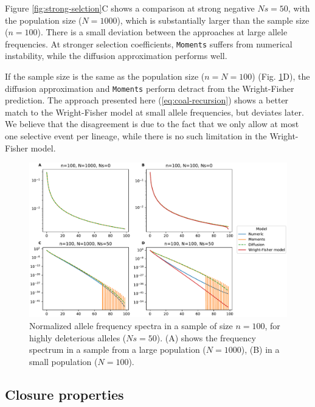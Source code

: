 \documentclass[review]{elsarticle}
\begin{document}
Figure \ref{fig:strong-selction}C shows a comparison at strong negative $Ns=50$, with the population
size ($N=1000$), which is substantially larger than the sample size ($n=100$). There is a small
deviation between the approaches at large allele frequencies. At stronger selection coefficients,
\texttt{Moments} suffers from numerical instability, while the diffusion approximation performs
well.

If the sample size is the same as the population size ($n=N=100$) (Fig.
\ref{fig:strong-selection}D), the diffusion approximation and \texttt{Moments} perform detract from
the Wright-Fisher prediction. The approach presented here (\ref{eq:coal-recursion}) shows a better
match to the Wright-Fisher model at small allele frequencies, but deviates later. We believe that
the disagreement is due to the fact that we only allow at most one selective event per lineage,
while there is no such limitation in the Wright-Fisher model.

\begin{figure}
  \centering
  \includegraphics[width=0.7\textheight]{fig/strong_selection_four_panel.pdf}
  \caption{Normalized allele frequency spectra in a sample of size $n=100$, for highly deleterious
    alleles ($Ns=50$). (A) shows the frequency spectrum in a sample from a large population
    ($N=1000$), (B) in a small population ($N=100$).}
  \label{fig:strong-selection}
\end{figure}


\subsection{Closure properties}
\label{subsec:closure}
\end{document}
